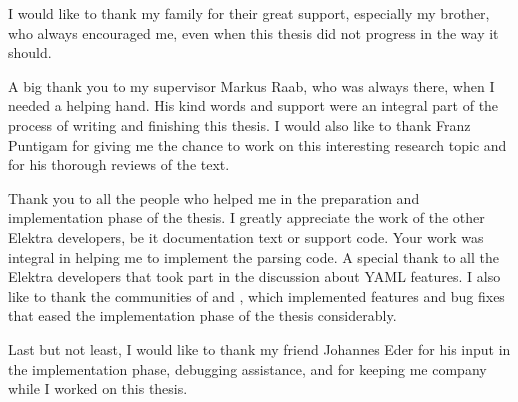 \begin{acknowledgements*}
I would like to thank my family for their great support, especially my brother, who always encouraged me, even when this thesis did not progress in the way it should.

A big thank you to my supervisor Markus Raab, who was always there, when I needed a helping hand. His kind words and support were an integral part of the process of writing and finishing this thesis. I would also like to thank Franz Puntigam for giving me the chance to work on this interesting research topic and for his thorough reviews of the text.

Thank you to all the people who helped me in the preparation and implementation phase of the thesis. I greatly appreciate the work of the other Elektra developers, be it documentation text or support code. Your work was integral in helping me to implement the parsing code. A special thank to all the Elektra developers that took part in the discussion about YAML features. I also like to thank the communities of  and , which implemented features and bug fixes that eased the implementation phase of the thesis considerably.

Last but not least, I would like to thank my friend Johannes Eder for his input in the implementation phase, debugging assistance, and for keeping me company while I worked on this thesis.
\end{acknowledgements*}

